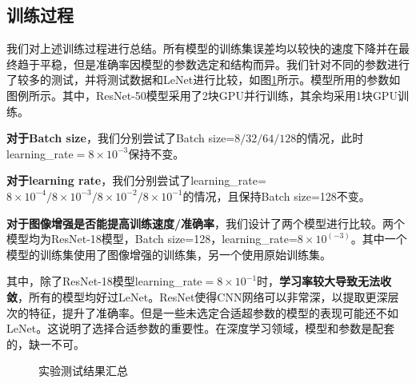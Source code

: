 \documentclass{article}
\theoremstyle{definition}
\begin{document}
\subsection{训练过程}

我们对上述训练过程进行总结。所有模型的训练集误差均以较快的速度下降并在最终趋于平稳，但是准确率因模型的参数选定和结构而异。我们针对不同的参数进行了较多的测试，并将测试数据和LeNet进行比较，如图\ref{fig:total}所示。模型所用的参数如图例所示。其中，ResNet-50模型采用了2块GPU并行训练，其余均采用1块GPU训练。

\textbf{对于Batch size}，我们分别尝试了Batch size=$8 / 32 / 64 / 128$的情况，此时learning\_rate$=8\times 10^{-3}$保持不变。

\textbf{对于learning rate}，我们分别尝试了learning\_rate=$8\times 10^{-4} / 8\times10^{-3} / 8\times10^{-2} / 8\times10^{-1}$的情况，且保持Batch size=128不变。

\textbf{对于图像增强是否能提高训练速度/准确率}，我们设计了两个模型进行比较。两个模型均为ResNet-18模型，Batch size=128，learning\_rate=$8\times10^(-3)$。其中一个模型的训练集使用了图像增强的训练集，另一个使用原始训练集。

其中，除了ResNet-18模型learning\_rate$=8\times 10^{-1}$时，\textbf{学习率较大导致无法收敛}，所有的模型均好过LeNet。ResNet使得CNN网络可以非常深，以提取更深层次的特征，提升了准确率。但是一些未选定合适超参数的模型的表现可能还不如LeNet。这说明了选择合适参数的重要性。在深度学习领域，模型和参数是配套的，缺一不可。
\begin{figure}[H]
	\centering
	\caption{实验测试结果汇总}
	\label{fig:total}
\end{figure}
\end{document}
